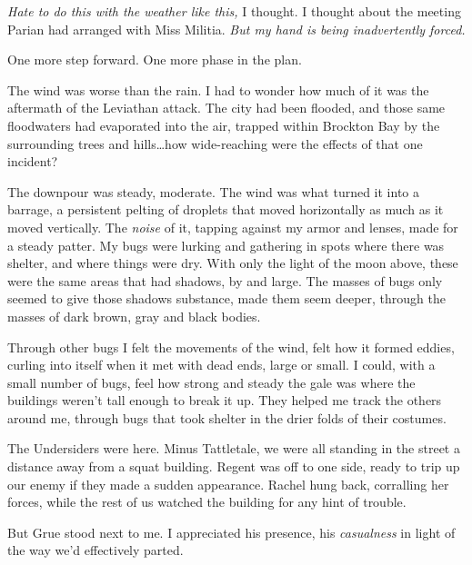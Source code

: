 





\emph{Hate to do this with the weather like this, }I thought.  I thought about the meeting Parian had arranged with Miss Militia.  \emph{But my hand is being inadvertently forced.}



One more step forward.  One more phase in the plan.



The wind was worse than the rain.  I had to wonder how much of it was the aftermath of the Leviathan attack.  The city had been flooded, and those same floodwaters had evaporated into the air, trapped within Brockton Bay by the surrounding trees and hills\ldots how wide-reaching were the effects of that one incident?



The downpour was steady, moderate.  The wind was what turned it into a barrage, a persistent pelting of droplets that moved horizontally as much as it moved vertically.  The \emph{noise} of it, tapping against my armor and lenses, made for a steady patter.  My bugs were lurking and gathering in spots where there was shelter, and where things were dry.  With only the light of the moon above, these were the same areas that had shadows, by and large.  The masses of bugs only seemed to give those shadows substance, made them seem deeper, through the masses of dark brown, gray and black bodies.



Through other bugs I felt the movements of the wind, felt how it formed eddies, curling into itself when it met with dead ends, large or small.  I could, with a small number of bugs, feel how strong and steady the gale was where the buildings weren't tall enough to break it up.  They helped me track the others around me, through bugs that took shelter in the drier folds of their costumes.



The Undersiders were here.  Minus Tattletale, we were all standing in the street a distance away from a squat building.  Regent was off to one side, ready to trip up our enemy if they made a sudden appearance.  Rachel hung back, corralling her forces, while the rest of us watched the building for any hint of trouble.



But Grue stood next to me.  I appreciated his presence, his \emph{casualness} in light of the way we'd effectively parted.



